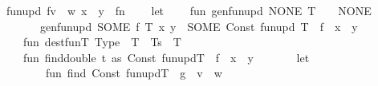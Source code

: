 \begin{isabellebody}
\begin{isamarkuptext}
\end{isamarkuptext}\isamarkuptrue%
%
\isadelimML
%
\endisadelimML
%
\isatagML
{}\isamarkupfalse%
\ fun{\isacharunderscore}{\kern0pt}upd{}\ {\isacharparenleft}{\kern0pt}{\isachardoublequoteopen}f{\isacharparenleft}{\kern0pt}v\ {\isacharcolon}{\kern0pt}{\isacharequal}{\kern0pt}\ w{\isacharcomma}{\kern0pt}\ x\ {\isacharcolon}{\kern0pt}{\isacharequal}{\kern0pt}\ y{\isacharparenright}{\kern0pt}{\isachardoublequoteclose}{\isacharparenright}{\kern0pt}\ {\isacharequal}{\kern0pt}\ {\isacartoucheopen}fn\ {\isacharunderscore}{\kern0pt}\ {\isacharequal}{\kern0pt}{\isachargreater}{\kern0pt}\isanewline
\ \ let\isanewline
\ \ \ \ fun\ gen{\isacharunderscore}{\kern0pt}fun{\isacharunderscore}{\kern0pt}upd\ NONE\ T\ {\isacharunderscore}{\kern0pt}\ {\isacharunderscore}{\kern0pt}\ {\isacharequal}{\kern0pt}\ NONE\isanewline
\ \ \ \ \ \ {\isacharbar}{\kern0pt}\ gen{\isacharunderscore}{\kern0pt}fun{\isacharunderscore}{\kern0pt}upd\ {\isacharparenleft}{\kern0pt}SOME\ f{\isacharparenright}{\kern0pt}\ T\ x\ y\ {\isacharequal}{\kern0pt}\ SOME\ {\isacharparenleft}{\kern0pt}Const\ {\isacharparenleft}{\kern0pt}\isactrlconstUNDERSCOREname {\isasymopen}fun{\isacharunderscore}{\kern0pt}upd{\isasymclose}{\isacharcomma}{\kern0pt}\ T{\isacharparenright}{\kern0pt}\ {\isachardollar}{\kern0pt}\ f\ {\isachardollar}{\kern0pt}\ x\ {\isachardollar}{\kern0pt}\ y{\isacharparenright}{\kern0pt}\isanewline
\ \ \ \ fun\ dest{\isacharunderscore}{\kern0pt}fun{\isacharunderscore}{\kern0pt}T{}\ {\isacharparenleft}{\kern0pt}Type\ {\isacharparenleft}{\kern0pt}{\isacharunderscore}{\kern0pt}{\isacharcomma}{\kern0pt}\ T\ {\isacharcolon}{\kern0pt}{\isacharcolon}{\kern0pt}\ Ts{\isacharparenright}{\kern0pt}{\isacharparenright}{\kern0pt}\ {\isacharequal}{\kern0pt}\ T\isanewline
\ \ \ \ fun\ find{\isacharunderscore}{\kern0pt}double\ {\isacharparenleft}{\kern0pt}t\ as\ Const\ {\isacharparenleft}{\kern0pt}\isactrlconstUNDERSCOREname {\isasymopen}fun{\isacharunderscore}{\kern0pt}upd{\isasymclose}{\isacharcomma}{\kern0pt}T{\isacharparenright}{\kern0pt}\ {\isachardollar}{\kern0pt}\ f\ {\isachardollar}{\kern0pt}\ x\ {\isachardollar}{\kern0pt}\ y{\isacharparenright}{\kern0pt}\ {\isacharequal}{\kern0pt}\isanewline
\ \ \ \ \ \ let\isanewline
\ \ \ \ \ \ \ \ fun\ find\ {\isacharparenleft}{\kern0pt}Const\ {\isacharparenleft}{\kern0pt}\isactrlconstUNDERSCOREname {\isasymopen}fun{\isacharunderscore}{\kern0pt}upd{\isasymclose}{\isacharcomma}{\kern0pt}T{\isacharparenright}{\kern0pt}\ {\isachardollar}{\kern0pt}\ g\ {\isachardollar}{\kern0pt}\ v\ {\isachardollar}{\kern0pt}\ w{\isacharparenright}{\kern0pt}\ {\isacharequal}{\kern0pt}\isanewline

\end{isabellebody}
